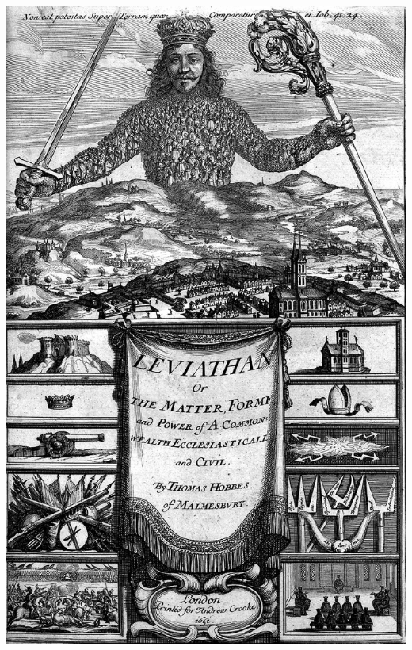 \documentclass[aspectratio=169]{beamer}
\theoremstyle{principle}
\begin{document}
\begin{frame}
\begin{columns}
\begin{column}{0.5\textwidth}  %
    \begin{center}
     \includegraphics[scale=0.1]{Leviathan.jpg}
     \end{center}
\end{column}

\end{columns}

\end{frame}
\end{document}

